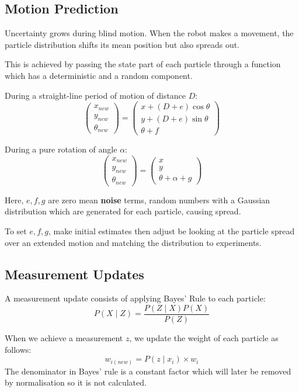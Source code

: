 \documentclass[11pt]{article}
\begin{document}
\subsection{Motion Prediction}
Uncertainty grows during blind motion.
When the robot makes a movement, the particle distribution shifts its mean position but also spreads out.

This is achieved by passing the state part of each particle through a function which has a deterministic and a random component.

During a straight-line period of motion of distance $D$:
\[
  \begin{pmatrix}
    x_{new} \\
    y_{new} \\
    \theta_{new}
  \end{pmatrix}
  =
  \begin{pmatrix}
    x + (D + e)\cos \theta \\
    y + (D + e)\sin \theta \\
    \theta + f
  \end{pmatrix}
\]

During a pure rotation of angle $\alpha$:
\[
  \begin{pmatrix}
    x_{new} \\
    y_{new} \\
    \theta_{new}
  \end{pmatrix}
  =
  \begin{pmatrix}
    x \\
    y \\
    \theta + \alpha + g
  \end{pmatrix}
\]

Here, $e, f, g$ are zero mean \textbf{noise} terms, random numbers with a Gaussian distribution which are generated for each particle, causing spread.

To set $e, f, g$, make initial estimates then adjust be looking at the particle spread over an extended motion and matching the distribution to experiments.

\subsection{Measurement Updates}
A measurement update consists of applying Bayes' Rule to each particle:
\[
  P(X \mid Z) = \frac{P(Z \mid X) P(X)}{P(Z)}
\]

When we achieve a measurement $z$, we update the weight of each particle as follows:
\[
  w_{i(new)} = P(z \mid x_i) \times w_i
\]
The denominator in Bayes' rule is a constant factor which will later be removed by normalisation so it is not calculated.
\end{document}
